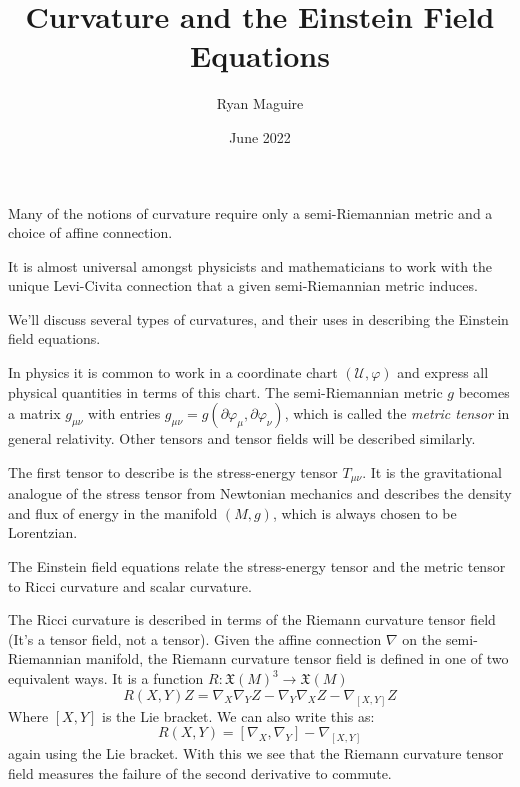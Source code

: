 \documentclass{beamer}
\title{Curvature and the Einstein Field Equations}
\author{Ryan Maguire}
\date{June 2022}
\begin{document}
    \maketitle
    \begin{frame}
        Many of the notions of curvature require only a semi-Riemannian metric
        and a choice of affine connection.
        \par\hfill\par
        It is almost universal amongst physicists and mathematicians to work
        with the unique Levi-Civita connection that a given semi-Riemannian
        metric induces.
        \par\hfill\par
        We'll discuss several types of curvatures, and their uses in
        describing the Einstein field equations.
    \end{frame}
    \begin{frame}
        In physics it is common to work in a coordinate chart
        $(\mathcal{U},\varphi)$ and express all physical quantities in terms of
        this chart. The semi-Riemannian metric $g$ becomes a matrix
        $g_{\mu\nu}$ with entries
        $g_{\mu\nu}=g(\partial\varphi_{\mu},\partial\varphi_{\nu})$, which is
        called the \textit{metric tensor} in general relativity. Other tensors
        and tensor fields will be described similarly.
    \end{frame}
    \begin{frame}
        The first tensor to describe is the stress-energy tensor $T_{\mu\nu}$.
        It is the gravitational analogue of the stress tensor from Newtonian
        mechanics and describes the density and flux of energy in the
        manifold $(M,g)$, which is always chosen to be Lorentzian.
        \par\hfill\par
        The Einstein field equations relate the stress-energy tensor and the
        metric tensor to Ricci curvature and scalar curvature.
    \end{frame}
    \begin{frame}
        The Ricci curvature is described in terms of the Riemann curvature
        tensor field (It's a tensor field, not a tensor). Given the affine
        connection $\nabla$ on the semi-Riemannian manifold, the Riemann
        curvature tensor field is defined in one of two equivalent ways.
        It is a function $R:\mathfrak{X}(M)^{3}\rightarrow\mathfrak{X}(M)$
        \begin{equation}
            R(X,Y)Z=
                \nabla_{X}\nabla_{Y}Z-\nabla_{Y}\nabla_{X}Z-\nabla_{[X,Y]}Z
        \end{equation}
        Where $[X,Y]$ is the Lie bracket. We can also write this as:
        \begin{equation}
            R(X,Y)=[\nabla_{X},\nabla_{Y}]-\nabla_{[X,Y]}
        \end{equation}
        again using the Lie bracket. With this we see that the Riemann
        curvature tensor field measures the failure of the second derivative to
        commute.
    \end{frame}
\end{document}
